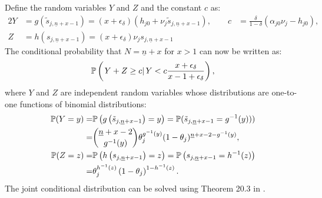 \documentclass[11 pt]{article}
\newcommand{\pr}[1]{\left( #1 \right)}
\newcommand{\cls}[2]{\left. #1 \right\vert #2}
\newcommand{\crs}[2]{#1 \left\vert #2 \right.}
\newcommand{\pass}{s}
\newcommand*{\ks}[1][t]{\tilde{\pass}_{j #1}}
\begin{document}
Define the random variables $Y$ and $Z$ and the constant $c$ as:
\begin{alignat*}{2}
    Y &= g(\ks[, \underline{n} + x - 1])  =
        \pr{x + \epsilon_\delta}
        \pr{h_{j0} 
        + \nu_j \ks[, \underline{n} + x - 1]},
    \quad \quad
    c &= \frac{\delta}{1 - \delta} \pr{\alpha_{j0} \nu_j - h_{j0}},
    \\
    Z &= h(\pass_{j, \underline{n} + x - 1}) = \pr{x + \epsilon_\delta}
        \nu_j \pass_{j, \underline{n} + x - 1}
\end{alignat*}
The conditional probability that $N = \underline{n} + x$ for $x > 1$ can now be written as:
\begin{align*}
    \PP \pr{\cls{Y + Z \geq c}{Y < c \frac{x + \epsilon_\delta}{x - 1 + \epsilon_\delta}}},
\end{align*}
where $Y$ and $Z$ are independent random variables whose distributions are one-to-one functions of binomial distributions:
\begin{align*}
    \PP (Y = y) 
    =& \PP \pr{ g\pr{\ks[,\underline{n} + x - 1]}= y}
    = \PP (\ks[,\underline{n} + x - 1] = g^{-1} (y)))
    \\
    =&
    \binom{\underline{n} + x - 2}{g^{-1} (y)}
    \theta_j^{g^{-1} (y)}
    (1 - \theta_j)^{\underline{n} + x - 2 - g^{-1} (y)},
    \\
    \PP
    (Z = z)
    =& \PP \pr{ h\pr{\pass_{j, \underline{n} + x - 1}} = z}
    = \PP \pr{\pass_{j, \underline{n} + x - 1} = h^{-1} (z)}
    \\
    =&
    \theta_j^{h^{-1}(z)} \pr{1 - \theta_j}^{1 - h^{-1}(z)}.
\end{align*}
The joint conditional distribution can be solved using Theorem 20.3 in \textcite[pg. 280]{B61}.


\end{document}

